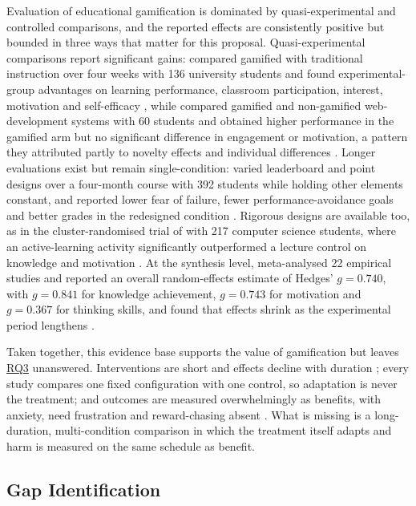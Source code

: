 \documentclass[12pt,a4paper]{article}
\DeclareRobustCommand{\rqlink}[1]{\texorpdfstring{\hyperref[rq:rq#1]{RQ#1}}{RQ#1}}
\begin{document}
\begin{justify}
Evaluation of educational gamification is dominated by quasi-experimental and controlled
comparisons, and the reported effects are consistently positive but bounded in three ways that
matter for this proposal. Quasi-experimental comparisons report significant gains: \textcite{zhang2026gamification}
compared gamified with traditional instruction over four weeks with 136 university students and
found experimental-group advantages on learning performance, classroom participation, interest,
motivation and self-efficacy , while \textcite{ojonuba2025web} compared
gamified and non-gamified web-development systems with 60 students and obtained higher performance
in the gamified arm but no significant difference in engagement or motivation, a pattern they
attributed partly to novelty effects and individual differences .
Longer evaluations exist but remain single-condition: \textcite{durmaz2022gamification} varied leaderboard and point
designs over a four-month course with 392 students while holding other elements constant, and
reported lower fear of failure, fewer performance-avoidance goals and better grades in the
redesigned condition . Rigorous designs are available too, as in
the cluster-randomised trial of \textcite{lopezfernandez2024lego} with 217 computer science students, where
an active-learning activity significantly outperformed a lecture control on knowledge and
motivation . At the synthesis level, \textcite{lu2024ai} meta-analysed 22
empirical studies and reported an overall random-effects estimate of Hedges' $g=0.740$, with
$g=0.841$ for knowledge achievement, $g=0.743$ for motivation and $g=0.367$ for thinking skills,
and found that effects shrink as the experimental period lengthens .

Taken together, this evidence base supports the value of gamification but leaves \rqlink{3}
unanswered. Interventions are short and effects decline with duration \parencite{lu2024ai,ming2025gamification};
every study compares one fixed configuration with one control, so adaptation is never the
treatment; and outcomes are measured overwhelmingly as benefits, with anxiety, need frustration
and reward-chasing absent \parencite{edwards2022anxiety}. What is missing is a long-duration,
multi-condition comparison in which the treatment itself adapts and harm is measured on the same
schedule as benefit.

\subsection{Gap Identification}


\end{justify}
\end{document}

